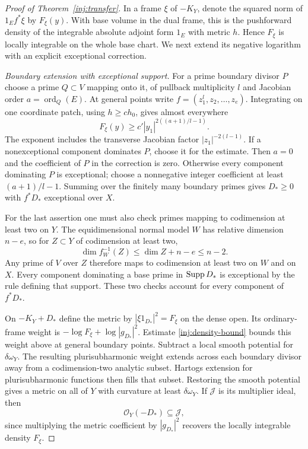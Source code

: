 \begin{proof}[Proof of Theorem~\ref{inj:transfer}]
In a frame $\xi$ of $-K_Y$, denote the squared norm of
$1_Ef^*\xi$ by $F_\xi(y)$.  With base volume in the dual frame,
this is the pushforward density of the integrable absolute adjoint
form $1_E$ with metric $h$.  Hence $F_\xi$ is locally integrable
on the whole base chart.  We next extend its negative logarithm
with an explicit exceptional correction.

\smallskip\noindent\textit{Boundary extension with exceptional support.} For a prime boundary divisor $P$ choose a prime $Q\subset V$
mapping onto it, of pullback multiplicity $l$ and Jacobian order
$a=\operatorname{ord}_Q(E)$.  At general points write
$f=(z_1^l,z_2,\ldots,z_e)$.  Integrating on one coordinate patch,
using $h\ge c h_0$, gives almost everywhere
\begin{equation}\label{inj:density-bound}
 F_\xi(y)\ge c'|y_1|^{2((a+1)/l-1)}.
\end{equation}
The exponent includes the transverse Jacobian factor
$|z_1|^{-2(l-1)}$. If a nonexceptional component dominates $P$, choose
it for the estimate. Then $a=0$ and the coefficient of $P$ in the
correction is zero. Otherwise every component dominating $P$ is
exceptional; choose a nonnegative integer coefficient at least
$(a+1)/l-1$. Summing
over the finitely many boundary primes gives $D_*\ge0$ with
$f^*D_*$ exceptional over $X$.

For the last assertion one must also check primes mapping to
codimension at least two on $Y$.  The equidimensional normal model
$W$ has relative dimension $n-e$, so for $Z\subset Y$ of
codimension at least two,
\[
 \dim f_W^{-1}(Z)\le\dim Z+n-e\le n-2.
\]
Any prime of $V$ over $Z$ therefore maps to codimension at least
two on $W$ and on $X$. Every component dominating a base prime in
$\operatorname{Supp} D_*$ is exceptional by the rule defining that support. These two checks
account for every component of $f^*D_*$.

On $-K_Y+D_*$ define the metric by
$|\xi1_{D_*}|^2=F_\xi$ on the dense open.
Its ordinary-frame weight is
$-\log F_\xi+\log|g_{D_*}|^2$.  Estimate
\eqref{inj:density-bound} bounds this weight above at general
boundary points. Subtract a local smooth potential for
$\delta\omega_Y$. The resulting plurisubharmonic weight extends
across each boundary divisor away from a codimension-two analytic
subset. Hartogs extension for plurisubharmonic functions then fills
that subset. Restoring the smooth potential gives a metric on all of
$Y$ with curvature at least $\delta\omega_Y$.
If $\mathcal J$ is its multiplier ideal, then
\begin{equation}\label{inj:fixed-ideal-inclusion}
 \mathcal O_Y(-D_*)\subseteq\mathcal J,
\end{equation}
since multiplying the metric coefficient by $|g_{D_*}|^2$
recovers the locally integrable density $F_\xi$.


\end{proof}
